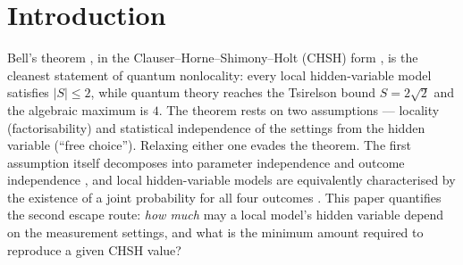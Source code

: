 \documentclass[aps,pra,reprint,superscriptaddress,floatfix]{revtex4-2}
\begin{document}
\section{Introduction}
\label{sec:intro}

Bell's theorem \cite{bell1964}, in the Clauser--Horne--Shimony--Holt (CHSH)
form \cite{chsh1969}, is the cleanest statement of quantum nonlocality: every
local hidden-variable model satisfies $|S|\le 2$, while quantum theory reaches
the Tsirelson bound $S=2\sqrt{2}$ \cite{cirelson1980} and the algebraic
maximum is $4$. The theorem rests on two assumptions --- locality (factorisability)
and statistical independence of the settings from the hidden variable
(``free choice''). Relaxing either one evades the theorem. The first
assumption itself decomposes into parameter independence and outcome
independence \cite{jarrett1984,shimony1984}, and local hidden-variable
models are equivalently characterised by the existence of a joint
probability for all four outcomes \cite{fine1982}. This paper quantifies the
second escape route: \emph{how much} may a local model's hidden variable
depend on the measurement settings, and what is the minimum amount required
to reproduce a given CHSH value?
\end{document}
